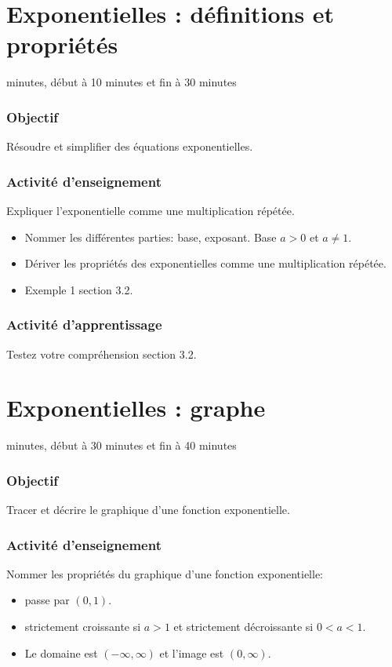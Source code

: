 \documentclass[12pt]{article}
\begin{document}
\clearpage
\section{Exponentielles : définitions et propriétés}
 minutes, début à 10 minutes et fin à 30 minutes
\subsubsection*{\faBullseye{} Objectif}
Résoudre et simplifier des équations exponentielles.
\subsubsection*{\faChalkboardTeacher{} Activité d'enseignement}
Expliquer l'exponentielle comme une multiplication répétée.
\begin{itemize}
\item Nommer les différentes parties: base, exposant. Base $a > 0$ et $a \neq 1$.
\item Dériver les propriétés des exponentielles comme une multiplication répétée.
\item Exemple 1 section 3.2.
\end{itemize}

\subsubsection*{\faCalculator{} Activité d'apprentissage}
Testez votre compréhension section 3.2.


\clearpage
\section{Exponentielles : graphe}
 minutes, début à 30 minutes et fin à 40 minutes
\subsubsection*{\faBullseye{} Objectif}
Tracer et décrire le graphique d'une fonction exponentielle.
\subsubsection*{\faChalkboardTeacher{} Activité d'enseignement}
Nommer les propriétés du graphique d'une fonction exponentielle: 
\begin{itemize}
\item passe par $(0,1)$.
\item strictement croissante si $a > 1$ et strictement décroissante si $0 < a < 1$.
\item Le domaine est $(-\infty, \infty)$ et l'image est $(0, \infty)$.
\end{itemize}
\end{document}

